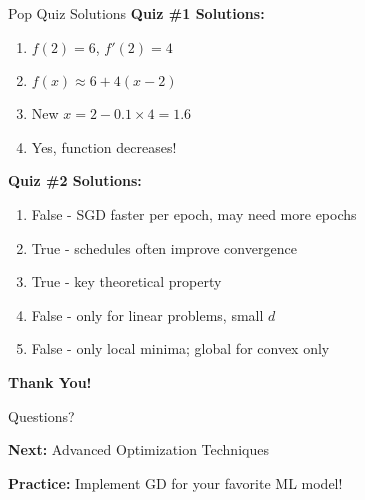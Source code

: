 \documentclass[usenames,dvipsnames]{beamer}
\begin{document}

  \begin{frame}{Pop Quiz Solutions}
    \textbf{Quiz \#1 Solutions:} 
    \begin{enumerate}
        \item $f(2) = 6$, $f'(2) = 4$
        \item $f(x) \approx 6 + 4(x-2)$
        \item New $x = 2 - 0.1 \times 4 = 1.6$
        \item Yes, function decreases!
    \end{enumerate}
    
    \pause
    \textbf{Quiz \#2 Solutions:}
    \begin{enumerate}
        \item False - SGD faster per epoch, may need more epochs
        \item True - schedules often improve convergence
        \item True - key theoretical property  
        \item False - only for linear problems, small $d$
        \item False - only local minima; global for convex only
    \end{enumerate}
  \end{frame}

  \begin{frame}
    \centering
    \Huge \textbf{Thank You!}
    
    \vspace{1cm}
    \Large Questions?
    
    \vspace{1cm}
    \normalsize
    \textbf{Next:} Advanced Optimization Techniques
    
    \textbf{Practice:} Implement GD for your favorite ML model!
  \end{frame}
\end{document}
